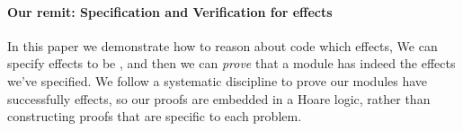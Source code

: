  


\paragraph{Our remit:  Specification and Verification for  \tamed effects}
In this paper we demonstrate how to reason about  code which \tames effects,
We can specify effects to be \tamed, 
and then we can \emph{prove} that a module has indeed \tamed the effects we've specified.
We follow a systematic discipline to prove our modules have successfully \tamed effects,
so our proofs are embedded in a Hoare logic, rather than constructing proofs that are specific to each problem.

